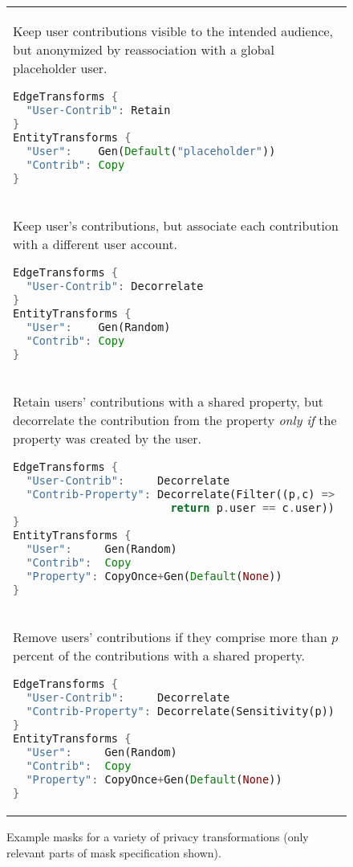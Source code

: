 \begin{figure}[th!]
    \footnotesize
    \begin{tabular}{p{}}
Keep user contributions visible to the intended audience, but anonymized by reassociation with a global
placeholder user.
\begin{lstlisting}[language=Rust]
EdgeTransforms {
  "User-Contrib": Retain
}
EntityTransforms {
  "User":    Gen(Default("placeholder")) 
  "Contrib": Copy
}
\end{lstlisting}

    \\

Keep user's contributions, but associate each contribution with a different user account.
\begin{lstlisting}[language=Rust]
EdgeTransforms {
  "User-Contrib": Decorrelate
}
EntityTransforms {
  "User":    Gen(Random)
  "Contrib": Copy
}
\end{lstlisting}

\\
Retain users' contributions with a shared property, but decorrelate the contribution
from the property \emph{only if} the property was created by
the user.
\begin{lstlisting}[language=Rust]
EdgeTransforms {
  "User-Contrib":     Decorrelate
  "Contrib-Property": Decorrelate(Filter((p,c) => 
                        return p.user == c.user))
}
EntityTransforms {
  "User":     Gen(Random)
  "Contrib":  Copy
  "Property": CopyOnce+Gen(Default(None)) 
}
\end{lstlisting}

        \\

Remove users' contributions if they comprise more than $p$ percent of the contributions
with a shared property.
\begin{lstlisting}[language=Rust]
EdgeTransforms {
  "User-Contrib":     Decorrelate
  "Contrib-Property": Decorrelate(Sensitivity(p))
}
EntityTransforms {
  "User":     Gen(Random)
  "Contrib":  Copy
  "Property": CopyOnce+Gen(Default(None)) 
}
\end{lstlisting}
\end{tabular}
\caption{Example masks for a variety of privacy transformations (only relevant parts of mask
specification shown).}
\label{fig:masks}
\end{figure}

